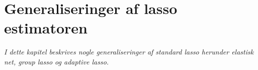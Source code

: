 \chapter{Generaliseringer af lasso estimatoren}
\textit{I dette kapitel beskrives nogle generaliseringer af standard lasso herunder elastisk net, group lasso og adaptive lasso.}






